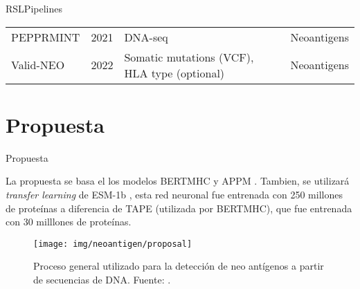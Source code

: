 \documentclass[10pt]{beamer}
\newcommand{\1}{
	\setbeamertemplate{background}{
		\texttt{[image: img/1]}
		\tikz[overlay] \fill[fill opacity=0.75,fill=white] (0,0) rectangle (-\paperwidth,\paperheight);
	}
}
\begin{document}
\begin{frame}{RSL}{Pipelines}
\begin{table}[]
{\begin{tabular}{lp{1.2cm}p{2.5cm}p{2.5cm}}
				PEPPRMINT         & 2021 \cite{zhou2021prioritizing}         & DNA-seq                                                  & Neoantigens                                        \\
				
				Valid-NEO       & 2022 \cite{terai2022valid}             & Somatic mutations (VCF), HLA type (optional)          & Neoantigens                                       
			\end{tabular}
		}
	\end{table}	
\end{frame}



\section{Propuesta}



\begin{frame}{Propuesta}{}

		La propuesta se basa el los modelos BERTMHC \cite{cheng2021bertmhc} y APPM \cite{hao2021improvement}. Tambien, se utilizará \textit{transfer learning} de ESM-1b \cite{rives2021biological}, esta red neuronal fue entrenada con 250 millones de proteínas a diferencia de TAPE (utilizada por BERTMHC), que fue entrenada con 30 milllones de proteínas. 
		


	\vspace{0.5cm}
	\begin{figure}[H]
		\centering
		\texttt{[image: img/neoantigen/proposal]}	
		\caption{Proceso general utilizado para la detección de neo antígenos a partir de secuencias de DNA. Fuente: \cite{gopanenko2020main}.}
		\label{fig:neo_det_seq}
	\end{figure}
\end{frame}
\end{document}
